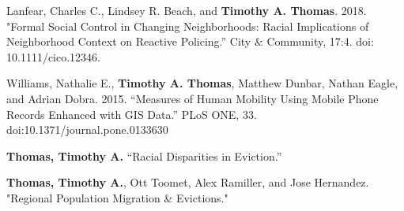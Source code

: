 

\begin{cvparagraph}

Lanfear, Charles C., Lindsey R. Beach, and \textbf{Timothy A. Thomas}. 2018. "Formal Social Control in Changing Neighborhoods: Racial Implications of Neighborhood Context on Reactive Policing.” City \& Community, 17:4. doi: 10.1111/cico.12346.
\end{cvparagraph}

\begin{cvparagraph}

Williams, Nathalie E., \textbf{Timothy A. Thomas}, Matthew Dunbar, Nathan Eagle, and Adrian Dobra. 2015. “Measures of Human Mobility Using Mobile Phone Records Enhanced
with GIS Data.” PLoS ONE, 33. doi:10.1371/journal.pone.0133630
\end{cvparagraph}


\begin{cvparagraph}

\textbf{Thomas, Timothy A.} “Racial Disparities in Eviction.”
\end{cvparagraph}

\begin{cvparagraph}

\textbf{Thomas, Timothy A.}, Ott Toomet, Alex Ramiller, and Jose Hernandez. "Regional Population Migration \& Evictions."
\end{cvparagraph}


